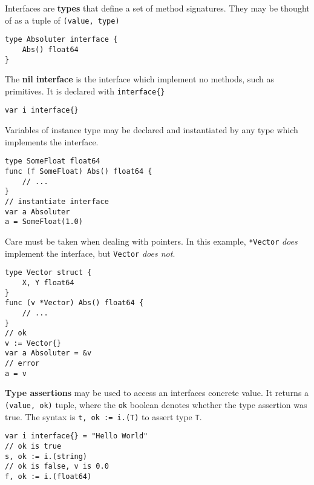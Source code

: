 \documentclass{article}
\begin{document}
\begin{paracol}{2}

Interfaces are \textbf{types} that define a set of method signatures. They may be thought of as a tuple of \lstinline|(value, type)|

\switchcolumn
\begin{lstlisting}
type Absoluter interface {
    Abs() float64
}
\end{lstlisting}
\switchcolumn*

\noindent The \textbf{nil interface} is the interface which implement no methods, such as primitives. It is declared with \lstinline|interface{}|
\\
\switchcolumn

\begin{lstlisting}
var i interface{}
\end{lstlisting}

\switchcolumn*

\noindent Variables of instance type may be declared and instantiated by any type which implements the interface.

\switchcolumn
\begin{lstlisting}
type SomeFloat float64
func (f SomeFloat) Abs() float64 {
    // ...
}
// instantiate interface
var a Absoluter
a = SomeFloat(1.0)
\end{lstlisting}

\switchcolumn*

\noindent Care must be taken when dealing with pointers. In this example, \lstinline|*Vector| \textit{does} implement the interface, but \lstinline|Vector| \textit{does not}.

\switchcolumn

\begin{lstlisting}
type Vector struct {
    X, Y float64
}
func (v *Vector) Abs() float64 {
    // ...
}
// ok
v := Vector{}
var a Absoluter = &v
// error
a = v 
\end{lstlisting}
\switchcolumn*

\noindent \textbf{Type assertions} may be used to access an interfaces concrete value. It returns a \lstinline|(value, ok)| tuple, where the \lstinline|ok| boolean denotes whether the type assertion was true. The syntax is \lstinline|t, ok := i.(T)| to assert type \lstinline|T|.

\switchcolumn
\begin{lstlisting}
var i interface{} = "Hello World"
// ok is true
s, ok := i.(string) 
// ok is false, v is 0.0
f, ok := i.(float64)
\end{lstlisting}
\switchcolumn*


\end{paracol}
\end{document}
